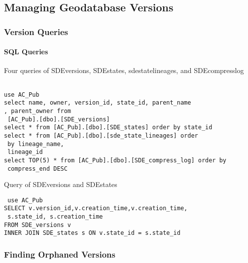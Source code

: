 \documentclass[class=article , crop=false, titlepage, twoside, multi={itemize, figure, verbatim}, float=false]{standalone}
\title{}  %
\begin{document}


\ifstandalone
\maketitle %
\tableofcontents %
\clearpage
\fi

\subsection{Managing Geodatabase Versions}
\medskip
\subsubsection[Version Queries]{\Large Version Queries}

\paragraph[SQL Queries]{SQL Queries \texorpdfstring{\\}{}}
Four queries of SDEversions, SDEstates, sdestatelineages, and SDEcompresslog

\begin{verbatim}

use AC_Pub
select name, owner, version_id, state_id, parent_name
, parent_owner from
 [AC_Pub].[dbo].[SDE_versions]
select * from [AC_Pub].[dbo].[SDE_states] order by state_id
select * from [AC_Pub].[dbo].[sde_state_lineages] order
 by lineage_name,
 lineage_id
select TOP(5) * from [AC_Pub].[dbo].[SDE_compress_log] order by
 compress_end DESC
 \end{verbatim}
Query of SDEversions and SDEstates

 \begin{verbatim}
 use AC_Pub
SELECT v.version_id,v.creation_time,v.creation_time,
 s.state_id, s.creation_time
FROM SDE_versions v
INNER JOIN SDE_states s ON v.state_id = s.state_id

\end{verbatim}
\clearpage
\subsubsection[Orphaned Versions]{\Large Finding Orphaned Versions}
\end{document}
